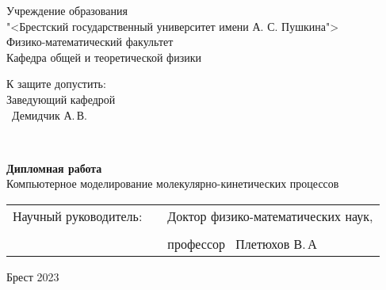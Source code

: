 \thispagestyle{empty}

\begin{center}
    Учреждение образования \\
"<Брестский государственный университет имени А. С. Пушкина"> \\
Физико-математический факультет \\
Кафедра общей и теоретической физики \\


    \vspace{20pt}
\end{center}

\begin{flushright}
    \begin{minipage}{0.4\textwidth}
      К защите допустить:\\[0.8em]
      Заведующий кафедрой \\[0.45em]
      \underline{\hspace*{2.8cm}}~Демидчик А.\,В.
    \end{minipage}\\[2.2em]
    
  \end{flushright}

\vspace{50pt}
  \begin{center}
    \textbf{Дипломная работа} \\
    \vspace{20pt}
  Компьютерное моделирование молекулярно-кинетических процессов

\end{center}
\vfill
    \vspace{20 pt}


\vspace{20 pt}
 \noindent
 \begin{tabular}{lp{4em}l}
   Научный руководитель:   &&  Доктор физико-математических наук, \\ \\
                          &&   профессор \hrulefill  ~Плетюхов В.\,А
 \end{tabular}
 \vfill

 \begin{center}
    {\normalsize Брест 2023}
  \end{center}
